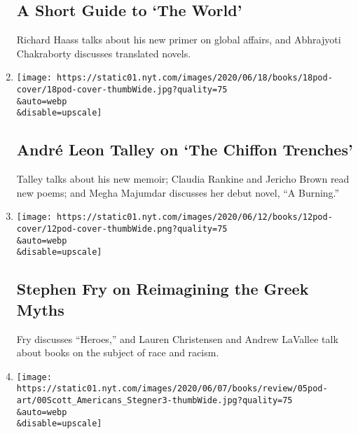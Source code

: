 \begin{enumerate}
  \hypertarget{a-short-guide-to-the-world}{%
  \subsection{A Short Guide to `The
  World'}\label{a-short-guide-to-the-world}}

  Richard Haass talks about his new primer on global affairs, and
  Abhrajyoti Chakraborty discusses translated novels.
\item
  \href{/2020/06/18/books/review/andre-leon-talley-chiffon-trenches-claudia-rankine-jericho-brown-megha-majumdar-burning.html}{}

  \texttt{[image: https://static01.nyt.com/images/2020/06/18/books/18pod-cover/18pod-cover-thumbWide.jpg?quality=75\\\&auto=webp\\\&disable=upscale]}

  \hypertarget{andruxe9-leon-talley-on-the-chiffon-trenches}{%
  \subsection{André Leon Talley on `The Chiffon
  Trenches'}\label{andruxe9-leon-talley-on-the-chiffon-trenches}}

  Talley talks about his new memoir; Claudia Rankine and Jericho Brown
  read new poems; and Megha Majumdar discusses her debut novel, ``A
  Burning.''
\item
  \href{/2020/06/12/books/review/podcast-stephen-fry-heroes-greek-myths.html}{}

  \texttt{[image: https://static01.nyt.com/images/2020/06/12/books/12pod-cover/12pod-cover-thumbWide.png?quality=75\\\&auto=webp\\\&disable=upscale]}

  \hypertarget{stephen-fry-on-reimagining-the-greek-myths}{%
  \subsection{Stephen Fry on Reimagining the Greek
  Myths}\label{stephen-fry-on-reimagining-the-greek-myths}}

  Fry discusses ``Heroes,'' and Lauren Christensen and Andrew LaVallee
  talk about books on the subject of race and racism.
\item
  \href{/2020/06/05/books/review/podcast-a-o-scott-wallace-stegner-sunny-days-david-kamp.html}{}

  \texttt{[image: https://static01.nyt.com/images/2020/06/07/books/review/05pod-art/00Scott\_Americans\_Stegner3-thumbWide.jpg?quality=75\\\&auto=webp\\\&disable=upscale]}


\end{enumerate}
